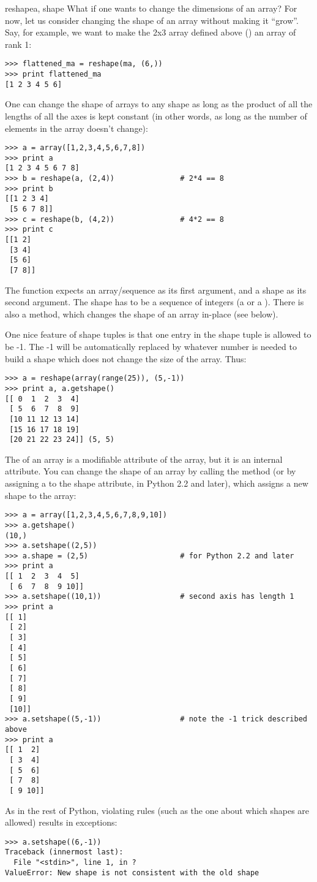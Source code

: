 \begin{funcdesc}{reshape}{a, shape}
   What if one wants to change the dimensions of an array? For now, let us
   consider changing the shape of an array without making it ``grow''. Say, for
   example, we want to make the 2x3 array defined above () an array of
   rank 1:
\begin{verbatim}
>>> flattened_ma = reshape(ma, (6,))
>>> print flattened_ma
[1 2 3 4 5 6]
\end{verbatim}
   One can change the shape of arrays to any shape as long as the product of
   all the lengths of all the axes is kept constant (in other words, as long as
   the number of elements in the array doesn't change):
\begin{verbatim}
>>> a = array([1,2,3,4,5,6,7,8])
>>> print a
[1 2 3 4 5 6 7 8]
>>> b = reshape(a, (2,4))               # 2*4 == 8
>>> print b
[[1 2 3 4]
 [5 6 7 8]]
>>> c = reshape(b, (4,2))               # 4*2 == 8
>>> print c
[[1 2]
 [3 4]
 [5 6]
 [7 8]]
\end{verbatim}
   The function  expects an array/sequence as its 
   first argument, and a shape as its second argument.
   The shape has to be a sequence of integers (a  or a
   ).  There is also a 
   method, which changes the shape of an array in-place (see below).
   
   One nice feature of shape tuples is that one entry in the shape tuple is
   allowed to be -1. The -1 will be automatically replaced by whatever number
   is needed to build a shape which does not change the size of the array.
   Thus:
\begin{verbatim}
>>> a = reshape(array(range(25)), (5,-1))
>>> print a, a.getshape()
[[ 0  1  2  3  4]
 [ 5  6  7  8  9]
 [10 11 12 13 14]
 [15 16 17 18 19]
 [20 21 22 23 24]] (5, 5)
\end{verbatim}
   The  of an array is a modifiable attribute of the array, but
   it is an internal attribute. You can change the shape of an array by calling
   the  method (or by assigning a  to the shape
   attribute, in Python 2.2 and later), which assigns a new shape to the array:
\begin{verbatim}
>>> a = array([1,2,3,4,5,6,7,8,9,10])
>>> a.getshape()
(10,)
>>> a.setshape((2,5))
>>> a.shape = (2,5)                     # for Python 2.2 and later
>>> print a
[[ 1  2  3  4  5]
 [ 6  7  8  9 10]]
>>> a.setshape((10,1))                  # second axis has length 1
>>> print a
[[ 1]
 [ 2]
 [ 3]
 [ 4]
 [ 5]
 [ 6]
 [ 7]
 [ 8]
 [ 9]
 [10]]
>>> a.setshape((5,-1))                  # note the -1 trick described above
>>> print a
[[ 1  2]
 [ 3  4]
 [ 5  6]
 [ 7  8]
 [ 9 10]]
\end{verbatim}
   As in the rest of Python, violating rules (such as the one about which
   shapes are allowed) results in exceptions:
\begin{verbatim}
>>> a.setshape((6,-1))
Traceback (innermost last):
  File "<stdin>", line 1, in ?
ValueError: New shape is not consistent with the old shape
\end{verbatim}
\end{funcdesc}


